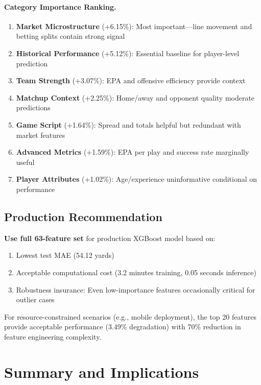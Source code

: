 \paragraph{Category Importance Ranking.}
\begin{enumerate}
  \item \textbf{Market Microstructure} (+6.15\%): Most important---line movement and betting splits contain strong signal
  \item \textbf{Historical Performance} (+5.12\%): Essential baseline for player-level prediction
  \item \textbf{Team Strength} (+3.07\%): EPA and offensive efficiency provide context
  \item \textbf{Matchup Context} (+2.25\%): Home/away and opponent quality moderate predictions
  \item \textbf{Game Script} (+1.64\%): Spread and totals helpful but redundant with market features
  \item \textbf{Advanced Metrics} (+1.59\%): EPA per play and success rate marginally useful
  \item \textbf{Player Attributes} (+1.02\%): Age/experience uninformative conditional on performance
\end{enumerate}

\subsection{Production Recommendation}

\textbf{Use full 63-feature set} for production XGBoost model based on:
\begin{enumerate}
  \item Lowest test MAE (54.12 yards)
  \item Acceptable computational cost (3.2 minutes training, 0.05 seconds inference)
  \item Robustness insurance: Even low-importance features occasionally critical for outlier cases
\end{enumerate}

For resource-constrained scenarios (e.g., mobile deployment), the top 20 features provide acceptable performance (3.49\% degradation) with 70\% reduction in feature engineering complexity.

\section{Summary and Implications}

